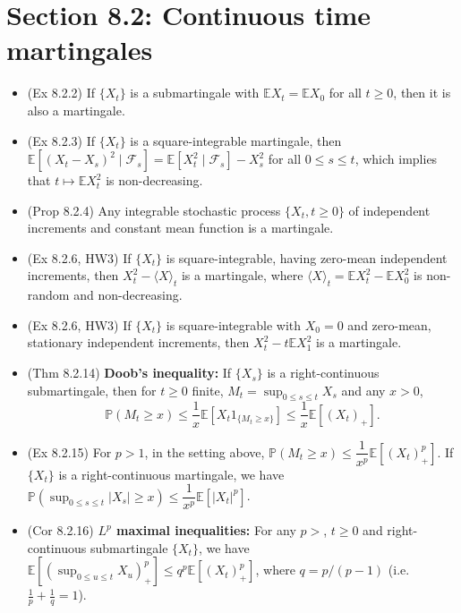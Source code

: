 \documentclass[twoside]{article}
\newcommand{\dis}{\displaystyle}
\newcommand\bbE{\mathbb{E}}
\newcommand\bbP{\mathbb{P}}
\newcommand\calF{\mathcal{F}}
\begin{document}
\section*{Section 8.2: Continuous time martingales}
\begin{itemize}
\item (Ex 8.2.2) If $\{X_t\}$ is a submartingale with $\bbE X_t = \bbE X_0$ for all $t \geq 0$, then it is also a martingale.

\item (Ex 8.2.3) If $\{ X_t\}$ is a square-integrable martingale, then $\bbE [(X_t - X_s)^2 \mid \calF_s] = \bbE [X_t^2 \mid \calF_s] - X_s^2$ for all $0 \leq s \leq t$, which implies that $t \mapsto \bbE X_t^2$ is non-decreasing.

\item (Prop 8.2.4) Any integrable stochastic process $\{X_t, t\geq0\}$ of independent increments and constant mean function is a martingale.

\item (Ex 8.2.6, HW3) If $\{X_t\}$ is square-integrable, having zero-mean independent increments, then $X_t^2 - \langle X \rangle_t$ is a martingale, where $\langle X \rangle_t = \bbE X_t^2 - \bbE X_0^2$ is non-random and non-decreasing.

\item (Ex 8.2.6, HW3) If $\{X_t\}$ is square-integrable with $X_0 = 0$ and zero-mean, stationary independent increments, then $X_t^2 - t\bbE X_1^2$ is a martingale.

\item (Thm 8.2.14) \textbf{Doob's inequality:} If $\{X_s\}$ is a right-continuous submartingale, then for $t \geq 0$ finite, $M_t = \dis\sup_{0 \leq s \leq t} X_s$ and any $x > 0$,
\[ \bbP (M_t \geq x) \leq \frac{1}{x} \bbE [X_t 1_{\{M_t \geq x\}}] \leq \frac{1}{x} \bbE [(X_t)_+]. \]

\item (Ex 8.2.15) For $p > 1$, in the setting above, $\bbP (M_t \geq x) \leq \dfrac{1}{x^p} \bbE [(X_t)_+^p]$. If $\{X_t\}$ is a right-continuous martingale, we have $\bbP \left(\dis\sup_{0 \leq s \leq t} |X_s| \geq x \right) \leq \dfrac{1}{x^p} \bbE [|X_t|^p]$.

\item (Cor 8.2.16) \textbf{$L^p$ maximal inequalities:} For any $p > $, $t \geq 0$ and right-continuous submartingale $\{X_t\}$, we have $\bbE \left[ \left(\dis\sup_{0 \leq u \leq t} X_u \right)_+^p \right] \leq q^p \bbE [(X_t)_+^p]$, where $q = p/(p-1)$ (i.e. $\frac{1}{p}+\frac{1}{q} = 1$).


\end{itemize}
\end{document}
